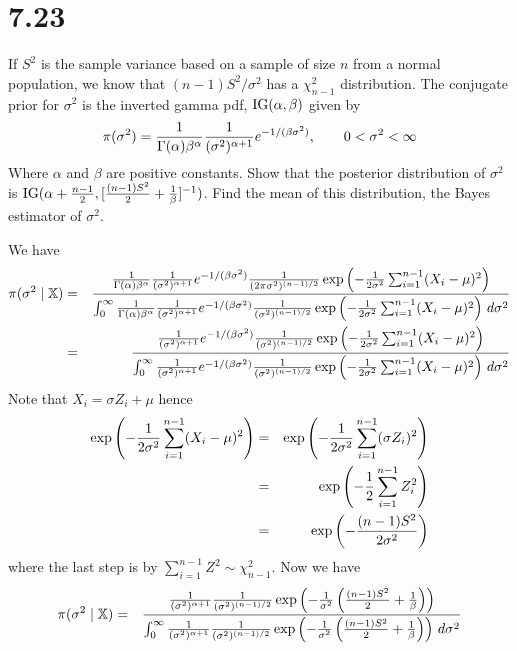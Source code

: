 \section*{7.23}
If $S^2$ is the sample variance based on a sample of size $n$
from a normal population, we know that $(n-1)S^2/\sigma^2$
has a $\chi^2_{n-1}$ distribution. The conjugate prior for $\sigma^2$
is the inverted gamma pdf, ${\rm IG}(\alpha,\beta)$ given by
$$\pi(\sigma^2)=
{1\over\Gamma(\alpha)\beta^\alpha}
{1\over(\sigma^2)^{\alpha+1}}
e^{-1/(\beta\sigma^2)},\qquad0<\sigma^2<\infty
$$
Where $\alpha$ and $\beta$ are positive constants.
Show that the posterior distribution of $\sigma^2$ is
${\rm IG}(\alpha+{n-1\over2},[{(n-1)S^2\over2}+{1\over\beta}]^{-1})$.
Find the mean of this distribution, the Bayes estimator of
$\sigma^2$.

\bigskip
\noindent
We have
\begin{eqnarray*}
\pi(\sigma^2\mid\mathbb X)&=&{
{1\over\Gamma(\alpha)\beta^\alpha}
{1\over(\sigma^2)^{\alpha+1}}
e^{-1/(\beta\sigma^2)}
{1\over(2\pi\sigma^2)^{(n-1)/2}}\exp\left(-{1\over2\sigma^2}
\sum_{i=1}^{n-1}(X_i-\mu)^2\right)
\over
\int_0^\infty
{1\over\Gamma(\alpha)\beta^\alpha}
{1\over(\sigma^2)^{\alpha+1}}
e^{-1/(\beta\sigma^2)}
{1\over(\sigma^2)^{(n-1)/2}}\exp\left(-{1\over2\sigma^2}
\sum_{i=1}^{n-1}(X_i-\mu)^2\right)\,d\sigma^2
}\\
&=&{
{1\over(\sigma^2)^{\alpha+1}}
e^{-1/(\beta\sigma^2)}
{1\over(\sigma^2)^{(n-1)/2}}\exp\left(-{1\over2\sigma^2}
\sum_{i=1}^{n-1}(X_i-\mu)^2\right)
\over
\int_0^\infty
{1\over(\sigma^2)^{\alpha+1}}
e^{-1/(\beta\sigma^2)}
{1\over(\sigma^2)^{(n-1)/2}}\exp\left(-{1\over2\sigma^2}
\sum_{i=1}^{n-1}(X_i-\mu)^2\right)\,d\sigma^2
}
\end{eqnarray*}
Note that $X_i=\sigma Z_i+\mu$ hence
\begin{eqnarray*}
\exp\left(-{1\over2\sigma^2}\sum_{i=1}^{n-1}(X_i-\mu)^2\right)
&=&\exp\left(-{1\over2\sigma^2}\sum_{i=1}^{n-1}(\sigma Z_i)^2\right)\\
&=&\exp\left(-{1\over2}\sum_{i=1}^{n-1}Z_i^2\right)\\
&=&\exp\left(-{(n-1)S^2\over2\sigma^2}\right)
\end{eqnarray*}
where the last step is by $\sum_{i=1}^{n-1}Z^2\sim\chi^2_{n-1}$.
Now we have
\begin{eqnarray*}
\pi(\sigma^2\mid\mathbb X)&=&
{
{1\over(\sigma^2)^{\alpha+1}}
{1\over(\sigma^2)^{(n-1)/2}}\exp\left(
-{1\over\sigma^2}\left({(n-1)S^2\over2}+{1\over\beta}\right)
\right)
\over
\int_0^\infty
{1\over(\sigma^2)^{\alpha+1}}
{1\over(\sigma^2)^{(n-1)/2}}\exp\left(
-{1\over\sigma^2}\left({(n-1)S^2\over2}+{1\over\beta}\right)
\right)\,d\sigma^2
}
\end{eqnarray*}
